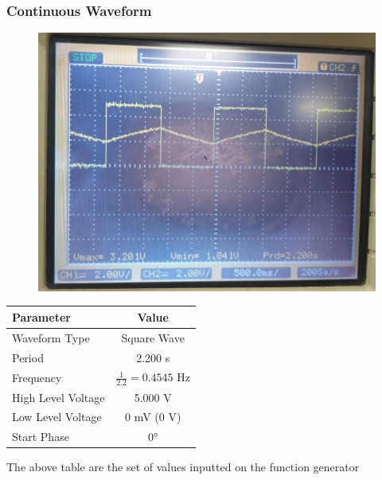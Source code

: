 \documentclass[journal]{IEEEtran}
\begin{document}
\subsubsection{Continuous Waveform}
\begin{figure}[H]
    \centering
    \includegraphics[width=0.75\linewidth]{figs/Rc=t1.jpeg}
\end{figure}
\begin{table}[h]
    \centering
    \renewcommand{\arraystretch}{1.3} %
    \begin{tabular}{|l|c|}
        \hline
        \textbf{Parameter} & \textbf{Value} \\
        \hline
        Waveform Type & Square Wave \\
        \hline
        Period & 2.200 s \\
        \hline
        Frequency & $\frac{1}{2.2} = 0.4545$ Hz \\
        \hline
        High Level Voltage & 5.000 V \\
        \hline
        Low Level Voltage & 0 mV (0 V) \\
        \hline
        Start Phase & 0° \\
        \hline
    \end{tabular}
\end{table}
The above table are the set of values inputted on the function generator
\end{document}
